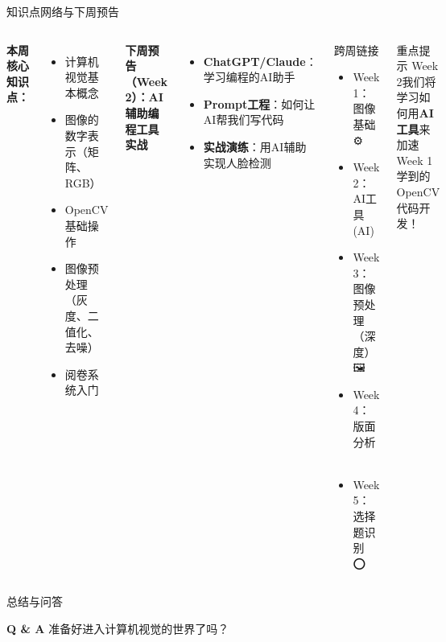 \begin{frame}{知识点网络与下周预告}
    \begin{columns}
        \textbf{本周核心知识点：}
        \begin{itemize}
            \item 计算机视觉基本概念
            \item 图像的数字表示（矩阵、RGB）
            \item OpenCV基础操作
            \item 图像预处理（灰度、二值化、去噪）
            \item 阅卷系统入门
        \end{itemize}

        \vspace{0.3cm}
        \textbf{下周预告（Week 2）：AI辅助编程工具实战}
        \begin{itemize}
            \item \textbf{ChatGPT/Claude}：学习编程的AI助手
            \item \textbf{Prompt工程}：如何让AI帮我们写代码
            \item \textbf{实战演练}：用AI辅助实现人脸检测
        \end{itemize}

        \begin{block}{跨周链接}
            \begin{itemize}
                \item Week 1：图像基础 ⚙️
                \item Week 2：AI工具 (AI)
                \item Week 3：图像预处理（深度） 🖼️
                \item Week 4：版面分析 📄
                \item Week 5：选择题识别 ⭕
            \end{itemize}
        \end{block}

        \vspace{0.3cm}
        \begin{alertblock}{重点提示}
        Week 2我们将学习如何用\textbf{AI工具}来加速Week 1学到的OpenCV代码开发！
        \end{alertblock}
    \end{columns}
\end{frame}

\begin{frame}{总结与问答}
    \begin{center}
        \Huge \textbf{Q \& A}
        \vspace{1cm}
        \Large 准备好进入计算机视觉的世界了吗？
    \end{center}
\end{frame}
